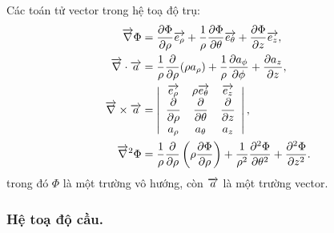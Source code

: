 \begin{appendices}
Các toán tử vector trong hệ toạ độ trụ:
\begin{align*}
    \ot{\nabla}\Phi&=\dfrac{\partial \Phi}{\partial \rho}\ot{e_\rho}+\dfrac{1}{\rho} \dfrac{\partial \Phi}{\partial \theta}\ot{e_\theta}+\dfrac{\partial \Phi}{\partial z}\ot{e_z},\\
    \ot{\nabla}\cdot\ot{a}&=\dfrac{1}{\rho}\dfrac{\partial}{\partial \rho}(\rho a_\rho)+\dfrac{1}{\rho}\dfrac{\partial a_\phi}{\partial \phi}+\dfrac{\partial a_z}{\partial z},\\
    \ot{\nabla}\times\ot{a}&=\left|\begin{array}{ccc}
    \ot{e_\rho} & \rho\ot{e_\theta} & \ot{e_z} \\
    \dfrac{\partial}{\partial\rho} & \dfrac{\partial}{\partial\theta} & \dfrac{\partial}{\partial z} \\
    a_\rho & a_\theta & a_z 
    \end{array}\right|,\\
    \ot{\nabla}^2\Phi&=\dfrac{1}{\rho}\dfrac{\partial}{\partial \rho}\left(\rho\dfrac{\partial\Phi}{ \partial\rho}\right)+\dfrac{1}{\rho^2}\dfrac{\partial^2\Phi}{ \partial \theta^2}+\dfrac{\partial^2\Phi}{\partial z^2}.
    \end{align*}
trong đó $\Phi$ là một trường vô hướng, còn $\ot{a}$ là một trường vector.
\subsubsection{Hệ toạ độ cầu.}
\begin{center}



\begin{tikzpicture}[x=0.75pt,y=0.75pt,yscale=-1,xscale=1]


\end{tikzpicture}
\end{center}
\end{appendices}
